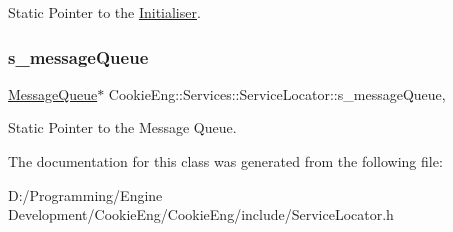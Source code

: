 Static Pointer to the \hyperlink{class_cookie_eng_1_1_services_1_1_initialiser}{Initialiser}. \mbox{\label{class_cookie_eng_1_1_services_1_1_service_locator_a69ae2c1a6385322f36009b87c90cc0de}} 
\subsubsection{\texorpdfstring{s\+\_\+message\+Queue}{s\_messageQueue}}
{\footnotesize\ttfamily \hyperlink{class_cookie_eng_1_1_services_1_1_message_queue}{Message\+Queue}$\ast$ Cookie\+Eng\+::\+Services\+::\+Service\+Locator\+::s\+\_\+message\+Queue\hspace{0.3cm}{\ttfamily [static]}, {\ttfamily [protected]}}

Static Pointer to the Message Queue. 

The documentation for this class was generated from the following file\+:\begin{DoxyCompactItemize}
\item 
D\+:/\+Programming/\+Engine Development/\+Cookie\+Eng/\+Cookie\+Eng/include/Service\+Locator.\+h\end{DoxyCompactItemize}
